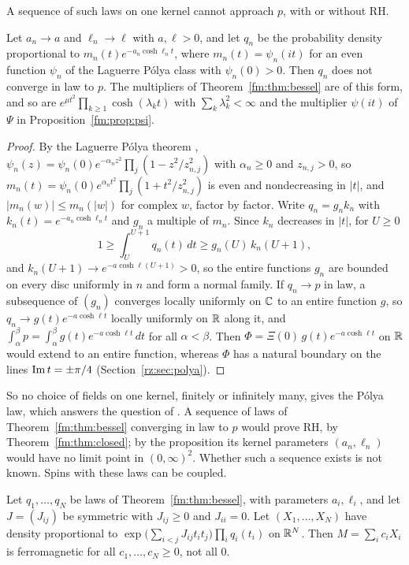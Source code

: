 A sequence of such laws on one kernel cannot approach $p$, with or without RH.

\begin{proposition}\label{fm:prop:fixedkernel}
Let $a_n\to a$ and $\ell_n\to\ell$ with $a,\ell>0$, and let $q_n$ be the probability density proportional to $m_n(t)e^{-a_n\cosh\ell_nt}$, where $m_n(t)=\psi_n(it)$ for an even function $\psi_n$ of the Laguerre P\'olya class with $\psi_n(0)>0$. Then $q_n$ does not converge in law to $p$. The multipliers of Theorem~\ref{fm:thm:bessel} are of this form, and so are $e^{\mu t^2}\prod_{k\ge1}\cosh(\lambda_kt)$ with $\sum_k\lambda_k^2<\infty$ and the multiplier $\psi(it)$ of $\Psi$ in Proposition~\ref{fm:prop:psi}.
\end{proposition}

\begin{proof}
By the Laguerre P\'olya theorem \cite{Levin64}, $\psi_n(z)=\psi_n(0)e^{-\alpha_nz^2}\prod_j(1-z^2/z_{n,j}^2)$ with $\alpha_n\ge0$ and $z_{n,j}>0$, so $m_n(t)=\psi_n(0)e^{\alpha_nt^2}\prod_j(1+t^2/z_{n,j}^2)$ is even and nondecreasing in $|t|$, and $|m_n(w)|\le m_n(|w|)$ for complex $w$, factor by factor. Write $q_n=g_nk_n$ with $k_n(t)=e^{-a_n\cosh\ell_nt}$ and $g_n$ a multiple of $m_n$. Since $k_n$ decreases in $|t|$, for $U\ge0$
\[
1\ge\int_U^{U+1}q_n(t)\,dt\ge g_n(U)\,k_n(U+1),
\]
and $k_n(U+1)\to e^{-a\cosh\ell(U+1)}>0$, so the entire functions $g_n$ are bounded on every disc uniformly in $n$ and form a normal family. If $q_n\to p$ in law, a subsequence of $(g_n)$ converges locally uniformly on $\mathbb{C}$ to an entire function $g$, so $q_n\to g(t)e^{-a\cosh\ell t}$ locally uniformly on $\mathbb{R}$ along it, and $\int_\alpha^\beta p=\int_\alpha^\beta g(t)e^{-a\cosh\ell t}\,dt$ for all $\alpha<\beta$. Then $\Phi=\Xi(0)\,g(t)e^{-a\cosh\ell t}$ on $\mathbb{R}$ would extend to an entire function, whereas $\Phi$ has a natural boundary on the lines $\operatorname{Im} t=\pm\pi/4$ (Section~\ref{rz:sec:polya}).
\end{proof}

So no choice of fields on one kernel, finitely or infinitely many, gives the P\'olya law, which answers the question of \cite{P26wferro,P26gumbel,P26gumbelop}. A sequence of laws of Theorem~\ref{fm:thm:bessel} converging in law to $p$ would prove RH, by Theorem~\ref{fm:thm:closed}; by the proposition its kernel parameters $(a_n,\ell_n)$ would have no limit point in $(0,\infty)^2$. Whether such a sequence exists is not known. Spins with these laws can be coupled.

\begin{corollary}\label{fm:cor:coupled}
Let $q_1,\dots,q_N$ be laws of Theorem~\ref{fm:thm:bessel}, with parameters $a_i,\ell_i$, and let $J=(J_{ij})$ be symmetric with $J_{ij}\ge0$ and $J_{ii}=0$. Let $(X_1,\dots,X_N)$ have density proportional to $\exp\big(\sum_{i<j}J_{ij}t_it_j\big)\prod_iq_i(t_i)$ on $\mathbb{R}^N$. Then $M=\sum_ic_iX_i$ is ferromagnetic for all $c_1,\dots,c_N\ge0$, not all $0$.
\end{corollary}

